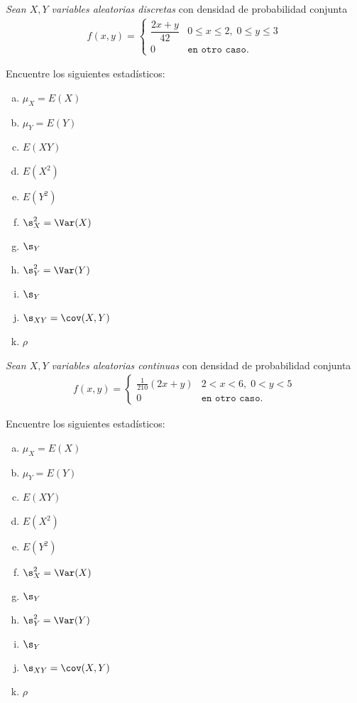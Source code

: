 \begin{ejemplo}
  \label{sol:3.25}
  \emph{Sean $X,Y$ variables aleatorias discretas} con densidad de probabilidad conjunta
  \begin{align}f(x,y)=
   \begin{cases}
    \dfrac{2x+y}{42} & 0\leq x \leq 2,\; 0\leq y \leq 3 \\
    0 & \texttt{en otro caso}.
   \end{cases}
  \end{align}
 \end{ejemplo}
 

Encuentre los siguientes estadísticos:
\begin{multicols}{3}
 \begin{enumerate}[(a)]
 \item $\mu_X = E(X)$ %
 \item $\mu_Y = E(Y)$ %
 \item $ E(XY)$ %
 \item $E(X^2)$ %
 \item $E(Y^2)$ %
 \item $\s^2_X = \Var(X)$ %
 \item $\s_{Y}$
 \item $\s^2_Y = \Var(Y)$ %
 \item $\s_{Y}$
 \item $\s_{XY} =\cov(X,Y)$ %
 \item $\rho$
\end{enumerate}
\end{multicols}






 \begin{ejemplo}
  \label{sol:3.26}
  \emph{Sean $X,Y$ variables aleatorias continuas} con densidad de probabilidad conjunta
  \begin{align}f(x,y)=
   \begin{cases}
    \frac{1}{210}(2x+y) & 2 < x < 6,\; 0<y<5 \\
    0 & \texttt{en otro caso}.
   \end{cases}
  \end{align}
 \end{ejemplo}

 

Encuentre los siguientes estadísticos:
\begin{multicols}{3}
 \begin{enumerate}[(a)]
 \item $\mu_X = E(X)$ %
 \item $\mu_Y = E(Y)$ %
 \item $ E(XY)$ %
 \item $E(X^2)$ %
 \item $E(Y^2)$ %
 \item $\s^2_X = \Var(X)$ %
 \item $\s_{Y}$
 \item $\s^2_Y = \Var(Y)$ %
 \item $\s_{Y}$
 \item $\s_{XY} =\cov(X,Y)$ %
 \item $\rho$
\end{enumerate}
\end{multicols}





